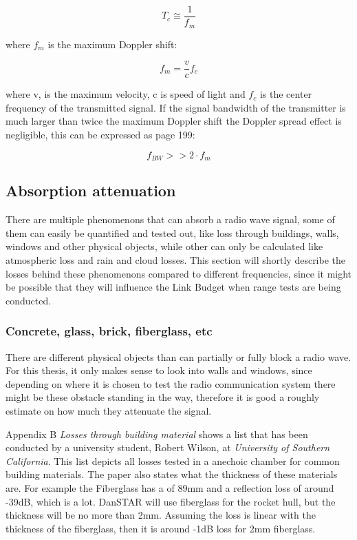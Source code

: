 \begin{equation}
    T_c \cong \frac{1}{f_m}
\end{equation}

where $f_m$ is the maximum Doppler shift:

\begin{equation}
    f_m = \frac{ v}{c}f_c
\end{equation}

where v, is the maximum velocity, c is speed of light and $f_c$ is the center frequency of the transmitted signal. If the signal bandwidth of the transmitter is much larger than twice the maximum Doppler shift the Doppler spread effect is negligible, this can be expressed as\cite{RFpropagation} page 199:

\begin{equation}
    f_{BW} >> 2 \cdot f_m
\end{equation}

\subsection{Absorption attenuation}
There are multiple phenomenons that can absorb a radio wave signal, some of them can easily be quantified and tested out, like loss through buildings, walls, windows and other physical objects, while other can only be calculated like atmospheric loss and rain and cloud losses. This section will shortly describe the losses behind these phenomenons compared to different frequencies, since it might be possible that they will influence the Link Budget when range tests are being conducted. 

\subsubsection{Concrete, glass, brick, fiberglass, etc}
There are different physical objects than can partially or fully block a radio wave. For this thesis, it only makes sense to look into walls and windows, since depending on where it is chosen to test the radio communication system there might be these obstacle standing in the way, therefore it is good a roughly estimate on how much they attenuate the signal. 

Appendix B \textit{Losses through building material} shows a list that has been conducted by a university student, Robert Wilson, at \textit{University of Southern California}. This list depicts all losses tested in a anechoic chamber for common building materials. The paper \cite{Magis} also states what the thickness of these materials are. For example the Fiberglass has a of 89mm and a reflection loss of around -39dB, which is a lot. DanSTAR will use fiberglass for the rocket hull, but the thickness will be no more than 2mm. Assuming the loss is linear with the thickness of the fiberglass, then it is around -1dB loss for 2mm fiberglass.

